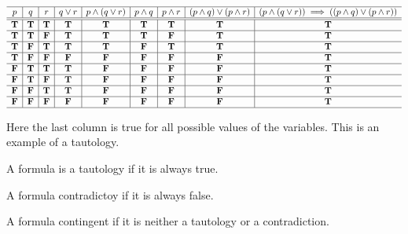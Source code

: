 \begin{example}
  \ifKey
  \color{red}
  \hfill $\begin{array}{c|c|c|c|c|c|c|c|c}
  \hline  
  p 			& q 				& r				& q \lor r & p \land (q \lor r)	& p \land q	& p \land r&( p \land q) \lor (p\land r) &(p \land (q \lor r))\implies (( p \land q) \lor (p\land r)) \\
  \hline
  \hline
 \mathbf{T} &  \mathbf{T} 	&  \mathbf{T} 	&  \mathbf{T} 	&  \mathbf{T} 	&  \mathbf{T}	&  \mathbf{T}	&  \mathbf{T}&  \mathbf{T}\\
  \hline
 \mathbf{T} &  \mathbf{T} 	&  \mathbf{F}  	&  \mathbf{T} 	&  \mathbf{T} 	&  \mathbf{T}	&  \mathbf{F}	&  \mathbf{T}&  \mathbf{T}\\
  \hline
 \mathbf{T} &  \mathbf{F} 	&  \mathbf{T}  	&  \mathbf{T} 	&  \mathbf{T} 	&  \mathbf{F}	&  \mathbf{T}	&  \mathbf{T}&  \mathbf{T}\\
  \hline
 \mathbf{T} &  \mathbf{F} 	&  \mathbf{F}  	&  \mathbf{F} 	&  \mathbf{F} 	&  \mathbf{F}	&  \mathbf{F}	&  \mathbf{F}&  \mathbf{T}\\
\hline
 \mathbf{F} &  \mathbf{T} 	&  \mathbf{T} 	&  \mathbf{T} 	&  \mathbf{F} 	&  \mathbf{F}	&  \mathbf{F}	&  \mathbf{F}&  \mathbf{T}\\
  \hline
 \mathbf{F} &  \mathbf{T} 	&  \mathbf{F}  	&  \mathbf{T} 	&  \mathbf{F} 	&  \mathbf{F}	&  \mathbf{F}	&  \mathbf{F}&  \mathbf{T}\\
  \hline
 \mathbf{F} &  \mathbf{F} 	&  \mathbf{T}  	&  \mathbf{T} 	&  \mathbf{F} 	&  \mathbf{F}	&  \mathbf{F}	&  \mathbf{F}&  \mathbf{T}\\
  \hline
 \mathbf{F} &  \mathbf{F} 	&  \mathbf{F}  	&  \mathbf{F} 	&  \mathbf{F} 	&  \mathbf{F}	&  \mathbf{F}	&  \mathbf{F}&  \mathbf{T}\\
    \hline
    \end{array}$
  \color{black}
  \fi
    
Here the last column is true for all possible values of the variables.  This is an example of a tautology.  
\end{example}  

\begin{definition}[Tautology]
A formula is a tautology if it is always true.
\end{definition}
\begin{definition}[Contradiction]
A formula contradictoy if it is always false.
\end{definition}
\begin{definition}[Contingent]
A formula contingent if it is neither a tautology or a contradiction.
\end{definition}


